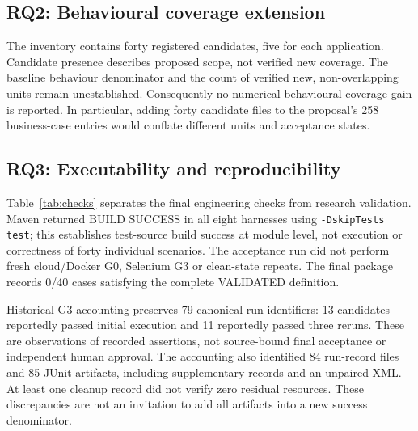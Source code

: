 \documentclass[pdflatex,sn-mathphys-num]{sn-jnl}
\begin{document}
\subsection{RQ2: Behavioural coverage extension}
The inventory contains forty registered candidates, five for each application. Candidate presence describes proposed scope, not verified new coverage. The baseline behaviour denominator and the count of verified new, non-overlapping units remain unestablished. Consequently no numerical behavioural coverage gain is reported. In particular, adding forty candidate files to the proposal's 258 business-case entries would conflate different units and acceptance states.

\subsection{RQ3: Executability and reproducibility}
Table~\ref{tab:checks} separates the final engineering checks from research validation. Maven returned BUILD SUCCESS in all eight harnesses using \texttt{-DskipTests test}; this establishes test-source build success at module level, not execution or correctness of forty individual scenarios. The acceptance run did not perform fresh cloud/Docker G0, Selenium G3 or clean-state repeats. The final package records 0/40 cases satisfying the complete VALIDATED definition.

Historical G3 accounting preserves 79 canonical run identifiers: 13 candidates reportedly passed initial execution and 11 reportedly passed three reruns. These are observations of recorded assertions, not source-bound final acceptance or independent human approval. The accounting also identified 84 run-record files and 85 JUnit artifacts, including supplementary records and an unpaired XML. At least one cleanup record did not verify zero residual resources. These discrepancies are not an invitation to add all artifacts into a new success denominator.
\end{document}
